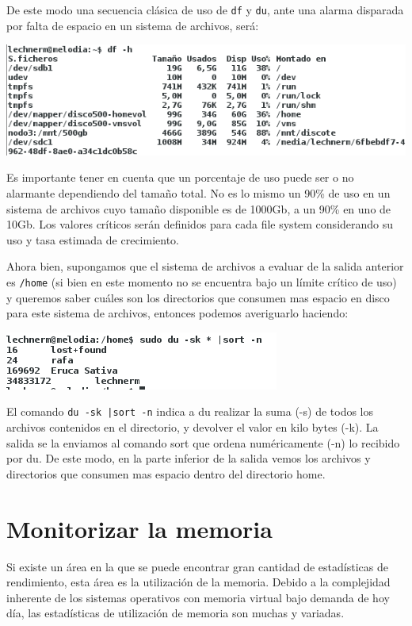 \documentclass[12pt]{article}
\begin{document}
De este modo una secuencia clásica de uso de {\tt df} y {\tt du}, ante
una alarma disparada por falta de espacio en un sistema de archivos, será:

\begin{center}
 \includegraphics{df.png}
\end{center}

Es importante tener en cuenta que un porcentaje de uso puede ser o no
alarmante dependiendo del tamaño total. No es lo mismo un 90\% de uso en 
un sistema de archivos cuyo tamaño disponible es de 1000Gb, a un 90\% en 
uno de 10Gb. Los valores críticos serán definidos para cada file system 
considerando su uso y tasa estimada de crecimiento. 

Ahora bien, supongamos que el sistema de archivos a evaluar de la salida 
anterior es {\tt /home} (si bien en este momento no se encuentra bajo 
un límite crítico de uso)  y queremos saber cuáles son los directorios 
que consumen mas espacio en disco para este sistema de archivos, entonces
podemos averiguarlo haciendo: 

\begin{center}
 \includegraphics{du.png}
\end{center}

El comando {\tt du -sk |sort -n} indica a du realizar la suma (-s) de todos
los archivos contenidos en el directorio, y devolver el valor en kilo bytes
(-k). La salida se la enviamos al comando {sort} que ordena numéricamente 
(-n) lo recibido por du. De este modo, en la parte inferior de la salida 
vemos los archivos y directorios que consumen mas espacio dentro del 
directorio home. 

\section*{Monitorizar la memoria}
Si existe un área en la que se puede encontrar gran cantidad de 
estadísticas de rendimiento, esta área es la utilización de la memoria. 
Debido a la complejidad inherente de los sistemas operativos con memoria 
virtual bajo demanda de hoy día, las estadísticas de utilización de memoria
 son muchas y variadas. 
\end{document}
